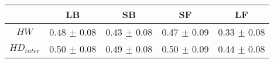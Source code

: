 \begin{tabular}{c c c c c }
\hline
 & LB & SB & SF & LF \\
\hline
$HW$ & 0.48 $\pm$ 0.08 & 0.43 $\pm$ 0.08 & 0.47 $\pm$ 0.09 & 0.33 $\pm$ 0.08 \\
$HD_{inter}$ & 0.50 $\pm$ 0.08 & 0.49 $\pm$ 0.08 & 0.50 $\pm$ 0.09 & 0.44 $\pm$ 0.08 \\
\hline
\end{tabular}